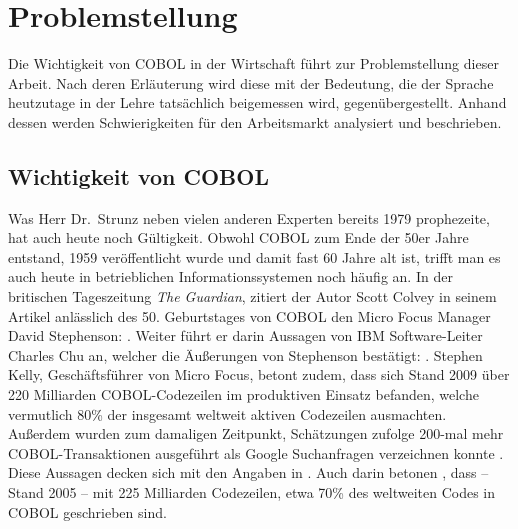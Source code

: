 \section{Problemstellung}\label{problemstellung}
Die Wichtigkeit von COBOL in der Wirtschaft führt zur Problemstellung dieser Arbeit. Nach deren Erläuterung wird diese mit der Bedeutung, die der Sprache heutzutage in der Lehre tatsächlich beigemessen wird, gegenübergestellt. Anhand dessen werden Schwierigkeiten für den Arbeitsmarkt analysiert und beschrieben.

\subsection*{Wichtigkeit von COBOL}\label{wichtigkeit}
 \cite{_ist_1979}

Was Herr Dr.\  Strunz neben vielen anderen Experten bereits 1979 prophezeite, hat auch heute noch Gültigkeit. Obwohl COBOL zum Ende der 50er Jahre entstand, 1959 veröffentlicht wurde und damit fast 60 Jahre alt ist, trifft man es auch heute in betrieblichen Informationssystemen noch häufig an. In der britischen Tageszeitung \textit{The Guardian}, zitiert der Autor Scott Colvey in seinem Artikel \cite{colvey_cobol_2009} anlässlich des 50. Geburtstages von COBOL den Micro Focus Manager David Stephenson: . Weiter führt er darin Aussagen von IBM Software-Leiter Charles Chu an, welcher die Äußerungen von Stephenson bestätigt: . Stephen Kelly, Geschäftsführer von Micro Focus, betont zudem, dass sich Stand 2009 über 220 Milliarden COBOL-Codezeilen im produktiven Einsatz befanden, welche vermutlich 80\% der insgesamt weltweit aktiven Codezeilen ausmachten. Außerdem wurden zum damaligen Zeitpunkt, Schätzungen zufolge 200-mal mehr COBOL-Transaktionen ausgeführt als Google Suchanfragen verzeichnen konnte \cite{kelly_cobol_2009}. Diese Aussagen decken sich mit den Angaben in . Auch darin betonen \citeauthor{doke_cobol_2005}, dass -- Stand 2005 -- mit 225 Milliarden Codezeilen, etwa 70\% des weltweiten Codes in COBOL geschrieben sind.

